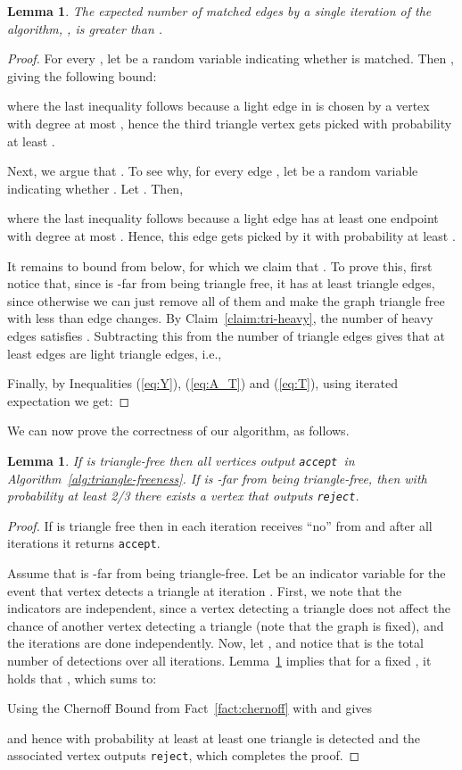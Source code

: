 \documentclass[11pt]{article}
\newtheorem{lemma}[theorem]{Lemma}
\newcommand{\accept}{\texttt{accept}}
\newcommand{\reject}{\texttt{reject}}
\begin{document}
\begin{lemma}
\label{lem:matched}
The expected number of matched edges by a single iteration of the algorithm, , is greater than .
\end{lemma}
\begin{proof}
For every , let  be a random variable indicating whether  is matched. Then , giving the following bound:

where the last inequality follows because a light edge in  is chosen by a vertex with degree at most , hence the third triangle vertex gets picked with probability at least .

Next, we argue that . To see why, for every edge , let  be a random variable indicating whether .
Let . Then,

where the last inequality follows because a light edge has at least one endpoint with degree at most . Hence, this edge gets picked by it with probability at least .

It remains to bound  from below, for which we claim that  . To prove this, first notice that, since  is -far from being triangle free, it has at least  triangle edges, since otherwise we can just remove all of them and make the graph triangle free with less than  edge changes.
By Claim~\ref{claim:tri-heavy}, the number of heavy edges satisfies . Subtracting this from the number of triangle edges gives that at least  edges are light triangle edges, i.e.,



Finally, by Inequalities (\ref{eq:Y}),  (\ref{eq:A_T}) and (\ref{eq:T}), using iterated expectation we get:

\end{proof}
	
We can now prove the correctness of our algorithm, as follows.	

\begin{lemma}
\label{lem:tri-test}
If  is triangle-free then all vertices output \accept ~in Algorithm~\ref{alg:triangle-freeness}. If  is -far from being triangle-free, then with probability at least 2/3 there exists a vertex that outputs \reject.
\end{lemma}

\begin{proof}
If  is triangle free then in each iteration  receives ``no'' from  and after all iterations it returns \accept.

Assume that  is -far from being triangle-free. Let  be an indicator variable for the event that vertex  detects a triangle at iteration .
First, we note that the indicators are independent, since a vertex detecting a triangle does not affect the chance of another vertex detecting a triangle (note that the graph is fixed), and the iterations are done independently.
Now, let , and notice that  is the total number of detections over all iterations. Lemma~\ref{lem:matched} implies that for a fixed , it holds that , which sums to:

Using the Chernoff Bound from Fact~\ref{fact:chernoff} with  and  gives

and hence with probability at least  at least one triangle is detected and the associated vertex outputs \reject, which completes the proof.
\end{proof}	
\end{document}
